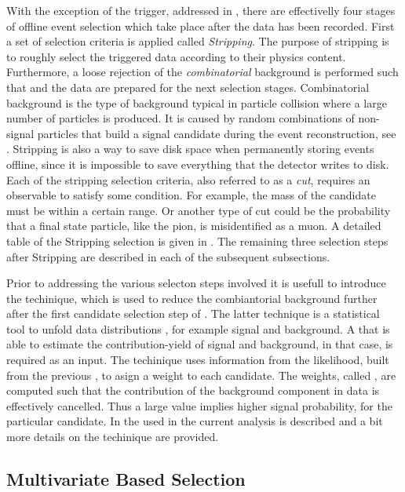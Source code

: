 
With the exception of the trigger, addressed in , there are effectivelly four stages of offline event
selection which take place after the data has been recorded.
First a set of selection criteria is applied called {\it Stripping}. The purpose of stripping is to roughly
select the triggered data according to their physics content. Furthermore, a loose rejection of the {\it combinatorial}
background is performed such that and the data are prepared for the next selection stages.
Combinatorial background is the type of background typical in particle collision where a large number of
particles is produced. It is caused by random combinations of non-signal particles that build a signal
candidate during the event reconstruction, see .
Stripping is also a way to save disk space when permanently storing events offline, since it is impossible
to save everything that the detector writes to disk. Each of the stripping selection criteria, also referred to as a {\it cut},
requires an observable to satisfy some condition. For example, the mass of the \Bs candidate must be within
a certain range. Or another type of cut could be the probability that a final state particle, like the pion, is misidentified
as a muon. A detailed table of the Stripping selection is given in . 
The remaining three selection steps after Stripping are described in each of the subsequent subsections.

Prior to addressing the various selecton steps involved it is usefull to introduce the \sPlot techinique, 
which is used to reduce the combiantorial background further after the first candidate selection step of 
. The latter technique is a statistical tool to 
unfold data distributions \cite{splot}, for example signal and background. A \pdf that is able to 
estimate the contribution-yield of signal and background, in that case, is required as an input. 
The \sPlot techinique uses information from the likelihood, built from the previous \pdf, to asign a 
weight to each candidate. The weights, called {\sWeights}, are computed such that the contribution
of the background component in data is effectively cancelled. Thus a large \sWeight value implies 
higher signal probability, for the particular candidate. In  the \pdf 
used in the current analysis is described and a bit more details on the \sPlot techinique are provided.

\subsection{Multivariate Based Selection}
\label{Multivariate_Based_Selection}

